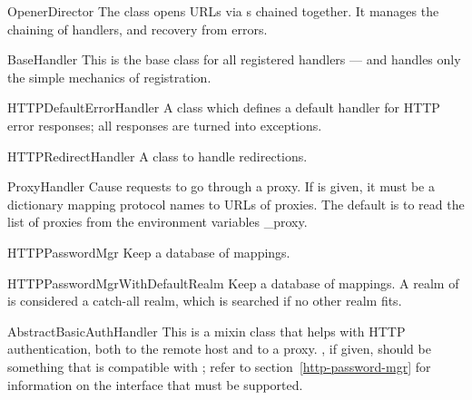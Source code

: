 \begin{classdesc}{OpenerDirector}{}
The  class opens URLs via s
chained together. It manages the chaining of handlers, and recovery
from errors.
\end{classdesc}

\begin{classdesc}{BaseHandler}{}
This is the base class for all registered handlers --- and handles only
the simple mechanics of registration.
\end{classdesc}

\begin{classdesc}{HTTPDefaultErrorHandler}{}
A class which defines a default handler for HTTP error responses; all
responses are turned into  exceptions.
\end{classdesc}

\begin{classdesc}{HTTPRedirectHandler}{}
A class to handle redirections.
\end{classdesc}

\begin{classdesc}{ProxyHandler}{}
Cause requests to go through a proxy.
If  is given, it must be a dictionary mapping
protocol names to URLs of proxies.
The default is to read the list of proxies from the environment
variables _proxy.
\end{classdesc}

\begin{classdesc}{HTTPPasswordMgr}{}
Keep a database of 
mappings.
\end{classdesc}

\begin{classdesc}{HTTPPasswordMgrWithDefaultRealm}{}
Keep a database of 
 mappings.
A realm of  is considered a catch-all realm, which is searched
if no other realm fits.
\end{classdesc}

\begin{classdesc}{AbstractBasicAuthHandler}{}
This is a mixin class that helps with HTTP authentication, both
to the remote host and to a proxy.
, if given, should be something that is compatible
with ; refer to section~\ref{http-password-mgr}
for information on the interface that must be supported.
\end{classdesc}

